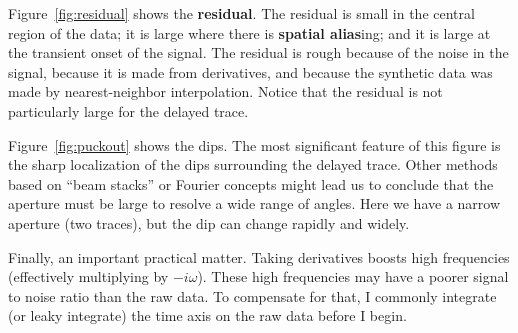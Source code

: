 \par
Figure~\ref{fig:residual} shows the {\bf residual}.
The residual is small in the central region of the data;
it is large where there is {\bf spatial alias}ing;
and it is large at the transient onset of the signal.
The residual is rough because of the noise in the signal,
because it is made from derivatives,
and because the synthetic data was made by nearest-neighbor interpolation.
Notice that the residual is not particularly large for the delayed trace. 
\par
Figure~\ref{fig:puckout} shows the dips.
The most significant feature of this figure
is the sharp localization of the dips surrounding the delayed trace.
Other methods based on ``beam stacks'' or Fourier concepts
might lead us to conclude that the aperture must be large
to resolve a wide range of angles.
Here we have a narrow aperture (two traces),
but the dip can change rapidly and widely.
\par
Finally, an important practical matter.   Taking derivatives
boosts high frequencies (effectively multiplying by $-i\omega$).
These high frequencies may have a poorer signal to noise ratio than the raw data.
To compensate for that, I commonly integrate (or leaky integrate)
the time axis on the raw data before I begin.


